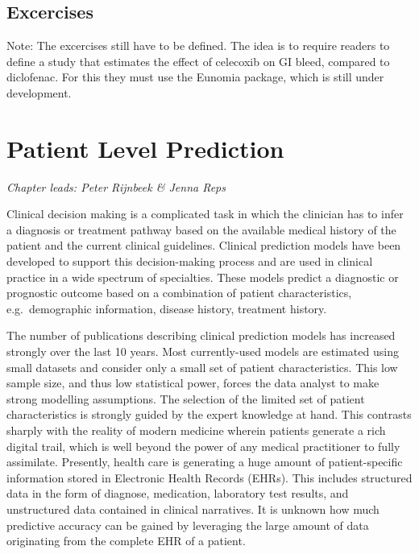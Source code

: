 \documentclass[11pt]{book}
\theoremstyle{definition}
\theoremstyle{definition}
\theoremstyle{definition}
\theoremstyle{remark}
\begin{document}
\hypertarget{excercises}{%
\section{Excercises}\label{excercises}}

Note: The excercises still have to be defined. The idea is to require readers to define a study that estimates the effect of celecoxib on GI bleed, compared to diclofenac. For this they must use the Eunomia package, which is still under development.

\hypertarget{PatientLevelPrediction}{%
\chapter{Patient Level Prediction}\label{PatientLevelPrediction}}

\emph{Chapter leads: Peter Rijnbeek \& Jenna Reps}

Clinical decision making is a complicated task in which the clinician has to infer a diagnosis or treatment pathway based on the available medical history of the patient and the current clinical guidelines. Clinical prediction models have been developed to support this decision-making process and are used in clinical practice in a wide spectrum of specialties. These models predict a diagnostic or prognostic outcome based on a combination of patient characteristics, e.g.~demographic information, disease history, treatment history.

The number of publications describing clinical prediction models has increased strongly over the last 10 years. Most currently-used models are estimated using small datasets and consider only a small set of patient characteristics. This low sample size, and thus low statistical power, forces the data analyst to make strong modelling assumptions. The selection of the limited set of patient characteristics is strongly guided by the expert knowledge at hand. This contrasts sharply with the reality of modern medicine wherein patients generate a rich digital trail, which is well beyond the power of any medical practitioner to fully assimilate. Presently, health care is generating a huge amount of patient-specific information stored in Electronic Health Records (EHRs). This includes structured data in the form of diagnose, medication, laboratory test results, and unstructured data contained in clinical narratives. It is unknown how much predictive accuracy can be gained by leveraging the large amount of data originating from the complete EHR of a patient.
\end{document}
